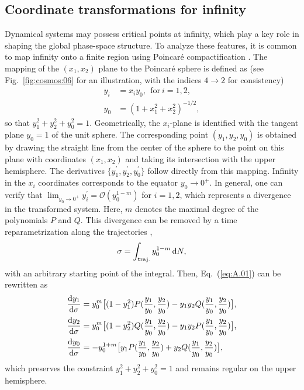 \documentclass[aps,prd,twocolumn]{revtex4-2}
\newcommand\dx{{\rm d}}
\begin{document}
\subsection{Coordinate transformations for infinity}\label{sec:App.A.3}
Dynamical systems may possess critical points at infinity, which play a key role in shaping the global phase-space structure. To analyze these features, it is common to map infinity onto a finite region using Poincar\'e compactification \cite{Lefschetz1957.book,Perko2001.book}. The mapping of the $(x_1,x_2)$ plane to the Poincar\'e sphere is defined as (see Fig.~\ref{fig:cosmos:06} for an illustration, with the indices $4\to2$ for consistency)
\begin{equation}\label{eq:A.07}
\begin{aligned}
  y_i &= x_iy_0, \mathrm{\ \ for\ } i=1,2, \\
  y_0 &= (1+x_1^2+x_2^2)^{-1/2},
\end{aligned}
\end{equation}
so that $y_1^2+y_2^2+y_0^2=1$. Geometrically, the $x_i$-plane is identified with the tangent plane $y_0=1$ of the unit sphere. The corresponding point $(y_1,y_2,y_0)$ is obtained by drawing the straight line from the center of the sphere to the point on this plane with coordinates $(x_1,x_2)$ and taking its intersection with the upper hemisphere. The derivatives $\{y_1^\prime,y_2^\prime,y_0^\prime\}$ follow directly from this mapping. Infinity in the $x_i$ coordinates corresponds to the equator $y_0\rightarrow0^{+}$. In general, one can verify that $\lim_{y_0\rightarrow 0^{+}}y_i^\prime = \mathcal{O}(y_0^{1-m})$ for $i=1,2$, which represents a divergence in the transformed system. Here, $m$ denotes the maximal degree of the polynomials $P$ and $Q$. This divergence can be removed by a time reparametrization along the trajectories \cite{Meiss2007.book},
\begin{equation}\label{eq:A.08}
  \sigma = \int_{\mathrm{traj.}} y_0^{1-m}\, \dx N,
\end{equation}
with an arbitrary starting point of the integral. Then, Eq.~(\ref{eq:A.01}) can be rewritten as
\begin{equation}\label{eq:A.09}
\begin{aligned}
  \frac{\dx y_1}{\dx\sigma} &= y_0^m \big[(1-y_1^2) P(\frac{y_1}{y_0},\frac{y_2}{y_0}) - y_1y_2 Q(\frac{y_1}{y_0},\frac{y_2}{y_0})\big], \\
  \frac{\dx y_2}{\dx\sigma} &= y_0^m \big[(1-y_2^2) Q(\frac{y_1}{y_0},\frac{y_2}{y_0}) - y_1y_2 P(\frac{y_1}{y_0},\frac{y_2}{y_0})\big], \\
  \frac{\dx y_0}{\dx\sigma} &= - y_0^{1+m} \big[y_1 P(\frac{y_1}{y_0},\frac{y_2}{y_0}) + y_2 Q(\frac{y_1}{y_0},\frac{y_2}{y_0})\big],
\end{aligned}
\end{equation}
which preserves the constraint $y_1^2+y_2^2+y_0^2=1$ and remains regular on the upper hemisphere.
\end{document}
